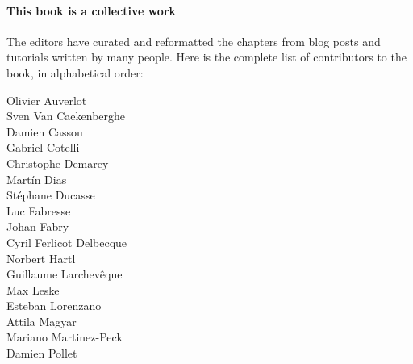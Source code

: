 \documentclass[11pt,english]{../support/latex/sbabook/sbabook}
\begin{document}
\paragraph{This book is a collective work}
The editors have curated and reformatted the chapters from blog posts
and tutorials written by many people. Here is the complete list of contributors
to the book, in alphabetical order:

\small

\begin{multicols}{3}
Olivier Auverlot\\
Sven Van Caekenberghe\\
Damien Cassou\\
Gabriel Cotelli\\
Christophe Demarey\\
Martín Dias\\
Stéphane Ducasse\\
Luc Fabresse\\
Johan Fabry\\
Cyril Ferlicot Delbecque\\
Norbert Hartl\\
Guillaume Larchevêque\\
Max Leske\\
Esteban Lorenzano\\
Attila Magyar\\
Mariano Martinez-Peck\\
Damien Pollet\\
\end{multicols}
\end{document}
